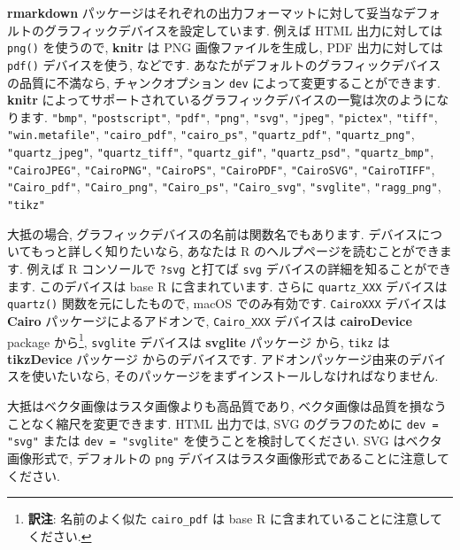\documentclass[
  11pt,
  lualatex,
  ja=standard]{bxjsreport}
\begin{document}
\textbf{rmarkdown} パッケージはそれぞれの出力フォーマットに対して妥当なデフォルトのグラフィックデバイスを設定しています. 例えば HTML 出力に対しては \texttt{png()} を使うので, \textbf{knitr} は PNG 画像ファイルを生成し, PDF 出力に対しては \texttt{pdf()} デバイスを使う, などです. あなたがデフォルトのグラフィックデバイスの品質に不満なら, チャンクオプション \texttt{dev} によって変更することができます. \textbf{knitr} によってサポートされているグラフィックデバイスの一覧は次のようになります. \texttt{"bmp"}, \texttt{"postscript"}, \texttt{"pdf"}, \texttt{"png"}, \texttt{"svg"}, \texttt{"jpeg"}, \texttt{"pictex"}, \texttt{"tiff"}, \texttt{"win.metafile"}, \texttt{"cairo\_pdf"}, \texttt{"cairo\_ps"}, \texttt{"quartz\_pdf"}, \texttt{"quartz\_png"}, \texttt{"quartz\_jpeg"}, \texttt{"quartz\_tiff"}, \texttt{"quartz\_gif"}, \texttt{"quartz\_psd"}, \texttt{"quartz\_bmp"}, \texttt{"CairoJPEG"}, \texttt{"CairoPNG"}, \texttt{"CairoPS"}, \texttt{"CairoPDF"}, \texttt{"CairoSVG"}, \texttt{"CairoTIFF"}, \texttt{"Cairo\_pdf"}, \texttt{"Cairo\_png"}, \texttt{"Cairo\_ps"}, \texttt{"Cairo\_svg"}, \texttt{"svglite"}, \texttt{"ragg\_png"}, \texttt{"tikz"}

大抵の場合, グラフィックデバイスの名前は関数名でもあります. デバイスについてもっと詳しく知りたいなら, あなたは R のヘルプページを読むことができます. 例えば R コンソールで \texttt{?svg} と打てば \texttt{svg} デバイスの詳細を知ることができます. このデバイスは base R に含まれています. さらに \texttt{quartz\_XXX} デバイスは \texttt{quartz()} 関数を元にしたもので, macOS でのみ有効です. \texttt{CairoXXX} デバイスは \textbf{Cairo} \autocite{R-Cairo} パッケージによるアドオンで, \texttt{Cairo\_XXX} デバイスは \textbf{cairoDevice} package \autocite{R-cairoDevice} から\footnote{\textbf{訳注}: 名前のよく似た \texttt{cairo\_pdf} は base R に含まれていることに注意してください.}, \texttt{svglite} デバイスは \textbf{svglite} パッケージ \autocite{R-svglite} から, \texttt{tikz} は \textbf{tikzDevice} パッケージ \autocite{R-tikzDevice} からのデバイスです. アドオンパッケージ由来のデバイスを使いたいなら, そのパッケージをまずインストールしなければなりません.

大抵はベクタ画像はラスタ画像よりも高品質であり, ベクタ画像は品質を損なうことなく縮尺を変更できます. HTML 出力では, SVG のグラフのために \texttt{dev = "svg"} または \texttt{dev = "svglite"} を使うことを検討してください. SVG はベクタ画像形式で, デフォルトの \texttt{png} デバイスはラスタ画像形式であることに注意してください.
\end{document}
